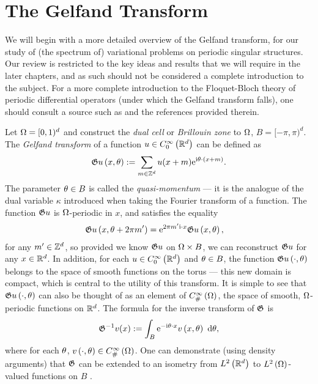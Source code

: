\section{The Gelfand Transform} \label{sec:TP-GelfandTransform}
We will begin with a more detailed overview of the Gelfand transform, for our study of (the spectrum of) variational problems on periodic singular structures.
Our review is restricted to the key ideas and results that we will require in the later chapters, and as such should not be considered a complete introduction to the subject.
For a more complete introduction to the Floquet-Bloch theory of periodic differential operators (under which the Gelfand transform falls), one should consult a source such as \cite[section 7.3]{kuchment2001mathematics} and the references provided therein.

Let $\Omega=[0,1)^d$  and construct the \emph{dual cell} or \emph{Brillouin zone} to $\Omega$, $B=[-\pi,\pi)^d$.
The \emph{Gelfand transform} of a function $u\in C^{\infty}_{0}\left( \mathbb{R}^d \right)$ can be defined as
\begin{align*}
	\mathfrak{G} u\left( x,\theta \right) := \sum_{m\in\mathbb{Z}^d}u(x+m)\mathrm{e}^{\mathrm{i}\theta\cdot(x+m)}.
\end{align*}
The parameter $\theta\in B$ is called the \emph{quasi-momentum} --- it is the analogue of the dual variable $\kappa$ introduced when taking the Fourier transform of a function.
The function $\mathfrak{G} u$ is $\Omega$-periodic in $x$, and satisfies the equality
\begin{align} \label{eq:GelfandTransform}
	\mathfrak{G} u\left( x,\theta+2\pi m' \right) &= \mathrm{e}^{2\pi m'\mathrm{i}\cdot x}\mathfrak{G} u\left( x,\theta \right),
\end{align}
for any $m'\in\mathbb{Z}^d$, so provided we know $\mathfrak{G} u$ on $\Omega\times B$, we can reconstruct $\mathfrak{G} u$ for any $x\in\mathbb{R}^d$.
In addition, for each $u\in C^{\infty}_{0}\left( \mathbb{R}^d \right)$ and $\theta\in B$, the function $\mathfrak{G} u\left( \cdot,\theta \right)$ belongs to the space of smooth functions on the torus --- this new domain is compact, which is central to the utility of this transform.
It is simple to see that $\mathfrak{G} u\left( \cdot,\theta \right)$ can also be thought of as an element of $C^{\infty}_{\#}\left( \Omega \right)$, the space of smooth, $\Omega$-periodic functions on $\mathbb{R}^d$.
The formula for the inverse transform of $\mathfrak{G}$ is
\begin{align*}
	\mathfrak{G}^{-1}v (x) := \int_{B}\mathrm{e}^{-\mathrm{i}\theta\cdot x}v\left( x,\theta \right) \ \mathrm{d}\theta,
\end{align*}
where for each $\theta$, $v\left( \cdot,\theta \right)\in C^{\infty}_{\#}\left( \Omega \right)$.
One can demonstrate (using density arguments) that $\mathfrak{G}$ can be extended to an isometry from $L^2\left( \mathbb{R}^d \right)$ to $L^2\left( \Omega \right)$-valued functions on $B$ \cite[theorem 7.3]{kuchment2001mathematics}.

